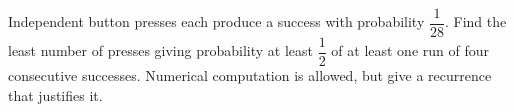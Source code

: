 Independent button presses each produce a success with probability $\dfrac{1}{28}$. Find the least number of presses giving probability at least $\dfrac{1}{2}$ of at least one run of four consecutive successes. Numerical computation is allowed, but give a recurrence that justifies it.
